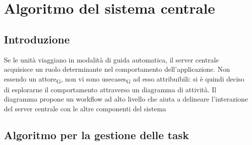 \section{Algoritmo del sistema centrale}
\subsection{Introduzione}
Se le unità viaggiano in modalità di guida automatica, il server centrale acquisisce un ruolo determinante nel comportamento dell'applicazione. Non essendo un \gls{attore}\textsubscript{G}, non vi sono \glspl{usecase}\textsubscript{G} ad esso attribuibili: si è quindi deciso di esplorarne il comportamento attraverso un diagramma di attività. Il diagramma propone un workflow ad alto livello che aiuta a delineare l'interazione del server centrale con le altre componenti del sistema

\subsection{Algoritmo per la gestione delle task}

